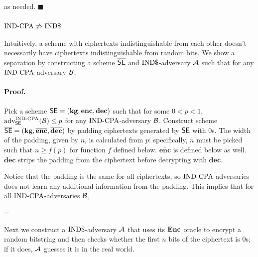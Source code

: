 as needed. $\blacksquare$

\subsubsection*{$\textnormal{IND-CPA} \not\Rightarrow \textnormal{IND\$}$}

Intuitively, a scheme with ciphertexts indistinguishable from each other
doesn't necessarily have ciphertexts indistinguishable from random bits.
We show a separation by constructing a scheme $\overline{\textnormal{\textsf{SE}}}$ and
$\textnormal{IND\$}$-adversary ${\mathcal A}$ such that for any $\textnormal{IND-CPA}$-adversary ${\mathcal B}$,

\bnm
\AdvROR{\overline{\SEscheme}}{\advA} \geq
\AdvINDCPA{\overline{\SEscheme}}{\advB}
\enm

\paragraph{Proof.}

Pick a scheme $\textnormal{\textsf{SE}} = (\textbf{kg},\textbf{enc},\textbf{dec})$
such that for some $0 < p < 1$, $\textnormal{adv}_{\textnormal{\textsf{SE}}}^{\textnormal{IND-CPA}}({\mathcal B}) \leq p$
for any $\textnormal{IND-CPA}$-adversary ${\mathcal B}$.
Construct scheme
$\overline{\textnormal{\textsf{SE}}} = (\textbf{kg},\overline{\textbf{enc}},\overline{\textbf{dec}})$
by padding ciphertexts generated by $\textnormal{\textsf{SE}}$ with 0s. The width of the
padding, given by $n$, is calculated from $p$: specifically, $n$ must be picked
such that $n \geq f(p)$ for function $f$ defined below.
$\overline{\textbf{enc}}$ is defined below as well.
$\overline{\textbf{dec}}$ strips the padding from the ciphertext before
decrypting with $\textbf{dec}$.


Notice that the padding is the same for all ciphertexts, so
$\textnormal{IND-CPA}$-adversaries does not learn any additional information from the
padding. This implies that for all $\textnormal{IND-CPA}$-adversaries ${\mathcal B}$,

\bnm
\AdvINDCPA{\overline{\SEscheme}}{\advB} = \AdvINDCPA{\SEscheme}{\advB}
\enm

Next we construct a $\textnormal{IND\$}$-adversary ${\mathcal A}$ that uses its $\textbf{Enc}$ oracle to
encrypt a random bitstring and then checks whether the first $n$ bits of the
ciphertext is 0s; if it does, ${\mathcal A}$ guesses it is in the real world.


